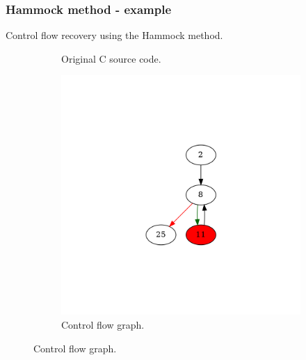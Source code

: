 \documentclass[aspectratio=1610]{beamer}
\begin{document}
\begin{frame}
	\frametitle{Hammock method - example}
	Control flow recovery using the Hammock method.
	\begin{figure}[htbp]
		\centering
		\begin{subfigure}[b]{0.30\textwidth}
			\centering
			
			\caption{Original C source code.}
		\end{subfigure}
		\begin{subfigure}[b]{0.50\textwidth}
			\centering
			\includegraphics[height=0.6\paperheight]{inc/methods/hammock/example/without-break/main_0002b.png}
			\caption{Control flow graph.}
		\end{subfigure}
	\end{figure}
\end{frame}
\end{document}
